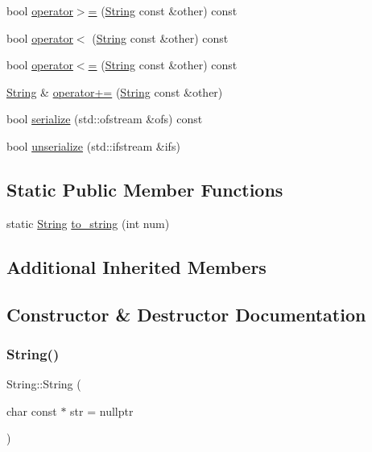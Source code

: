\begin{DoxyCompactItemize}
bool \hyperlink{classString_a21e5e59295a87f0af5b082c294c12f11}{operator$>$=} (\hyperlink{classString}{String} const \&other) const
\item 
bool \hyperlink{classString_a223bf46daeb4d9b4a7000feea4d7a6b3}{operator$<$} (\hyperlink{classString}{String} const \&other) const
\item 
bool \hyperlink{classString_a2ee4e8d42626851256a5432bf838d5f9}{operator$<$=} (\hyperlink{classString}{String} const \&other) const
\item 
\hyperlink{classString}{String} \& \hyperlink{classString_acdfa6ad1771ff7c9f9a9dacc177e6661}{operator+=} (\hyperlink{classString}{String} const \&other)
\item 
bool \hyperlink{classString_a05ec329796015f98719b6a924c0f0eb4}{serialize} (std\+::ofstream \&ofs) const
\item 
bool \hyperlink{classString_a66de7cb14dd606a96dbe3fa8b6aff065}{unserialize} (std\+::ifstream \&ifs)
\end{DoxyCompactItemize}
\subsection*{Static Public Member Functions}
\begin{DoxyCompactItemize}
\item 
static \hyperlink{classString}{String} \hyperlink{classString_a52f9352ece5a5266018539183b0de85c}{to\+\_\+string} (int num)
\end{DoxyCompactItemize}
\subsection*{Additional Inherited Members}


\subsection{Constructor \& Destructor Documentation}
\mbox{\label{classString_a33582c77a4e6b03f950082593cc57de4}} 
\subsubsection{\texorpdfstring{String()}{String()}}
{\footnotesize\ttfamily String\+::\+String (\begin{DoxyParamCaption}\item[{char const $\ast$}]{str = {\ttfamily nullptr} }\end{DoxyParamCaption})}




